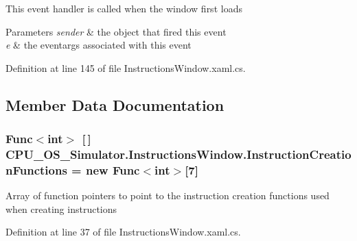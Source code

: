 This event handler is called when the window first loads 


\begin{DoxyParams}{Parameters}
{\em sender} & the object that fired this event\\
\hline
{\em e} & the eventargs associated with this event\\
\hline
\end{DoxyParams}


Definition at line 145 of file Instructions\+Window.\+xaml.\+cs.



\subsection{Member Data Documentation}
\hypertarget{class_c_p_u___o_s___simulator_1_1_instructions_window_ae303b32cfc2f5e7cc5ab18df94fd574b}{}
\subsubsection[{Instruction\+Creation\+Functions}]{\setlength{\rightskip}{0pt plus 5cm}Func$<$int$>$ \mbox{[}$\,$\mbox{]} C\+P\+U\+\_\+\+O\+S\+\_\+\+Simulator.\+Instructions\+Window.\+Instruction\+Creation\+Functions = new Func$<$int$>$\mbox{[}7\mbox{]}\hspace{0.3cm}{\ttfamily [private]}}\label{class_c_p_u___o_s___simulator_1_1_instructions_window_ae303b32cfc2f5e7cc5ab18df94fd574b}


Array of function pointers to point to the instruction creation functions used when creating instructions 



Definition at line 37 of file Instructions\+Window.\+xaml.\+cs.

\hypertarget{class_c_p_u___o_s___simulator_1_1_instructions_window_a678ab4df2b78758142472eeed8c5d7ba}{}
